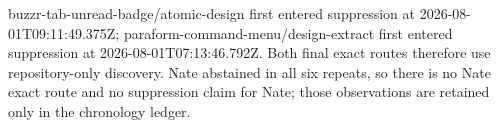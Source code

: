 buzzr-tab-unread-badge/atomic-design first entered suppression at 2026-08-01T09:11:49.375Z; paraform-command-menu/design-extract first entered suppression at 2026-08-01T07:13:46.792Z. Both final exact routes therefore use repository-only discovery. Nate abstained in all six repeats, so there is no Nate exact route and no suppression claim for Nate; those observations are retained only in the chronology ledger.
